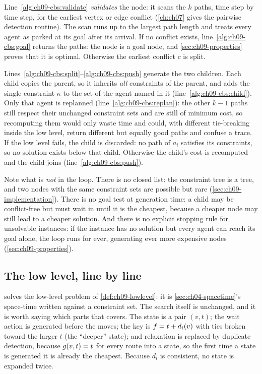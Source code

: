Line~\ref{alg:ch09-cbs:validate} \emph{validates} the node: it scans the
$k$ paths, time step by time step, for the earliest vertex or edge conflict
(\cref{ch:ch07} gives the pairwise detection routine). The scan runs up to
the largest path length and treats every agent as parked at its goal after
its arrival. If no conflict exists, line~\ref{alg:ch09-cbs:goal} returns the
paths: the node is a goal node, and \cref{sec:ch09-properties} proves that
it is optimal. Otherwise the earliest conflict $c$ is split.

Lines~\ref{alg:ch09-cbs:split}--\ref{alg:ch09-cbs:push} generate the two
children. Each child copies the parent, so it inherits \emph{all} constraints
of the parent, and adds the single constraint $\kappa$ to the set of the
agent named in it (line~\ref{alg:ch09-cbs:child}). Only that agent is
replanned (line~\ref{alg:ch09-cbs:replan}): the other $k-1$ paths still
respect their unchanged constraint sets and are still of minimum cost, so
recomputing them would only waste time and could, with different
tie-breaking inside the low level, return different but equally good paths
and confuse a trace. If the low level fails, the child is discarded: no path
of $a_i$ satisfies its constraints, so no solution exists below that child.
Otherwise the child's cost is recomputed and the child joins \Open
(line~\ref{alg:ch09-cbs:push}).

Note what is \emph{not} in the loop. There is no closed list: the constraint
tree is a tree, and two nodes with the same constraint sets are possible but
rare (\cref{sec:ch09-implementation}). There is no goal test at generation
time: a child may be conflict-free but must wait in \Open until it is the
cheapest, because a cheaper node may still lead to a cheaper solution. And
there is no explicit stopping rule for unsolvable instances: if the instance
has no solution but every agent can reach its goal alone, the loop runs for
ever, generating ever more expensive nodes (\cref{sec:ch09-properties}).

\subsection{The low level, line by line}
\label{sec:ch09-lowlevel}

 solves the low-level problem of
\cref{def:ch09-lowlevel}: it is \cref{sec:ch04-spacetime}'s space-time \astar
written against a constraint set. The search itself is
unchanged, and it is worth saying which parts that covers. The state is a pair
$(v, t)$; the wait action is generated before the moves; the key is
$f = t + d_i(v)$ with ties broken toward the larger $t$ (the ``deeper''
state); and relaxation is replaced by duplicate detection, because
$g(v, t) = t$ for every route into a state, so the first time a state is
generated it is already the cheapest. Because $d_i$ is consistent, no state is
expanded twice.

